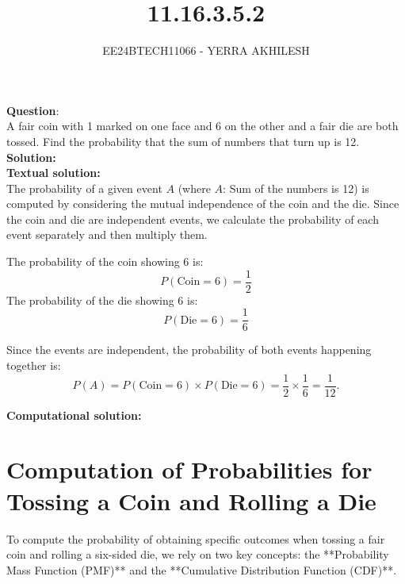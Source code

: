 \documentclass[journal]{IEEEtran}
\begin{document}

\vspace{3cm}

\title{11.16.3.5.2}
\author{EE24BTECH11066 - YERRA AKHILESH}
{\let\newpage\relax\maketitle}

\renewcommand{\thefigure}{\theenumi}
\renewcommand{\thetable}{\theenumi}
\setlength{\intextsep}{10pt} %

\renewcommand{\thetable}{\theenumi}

\textbf{Question}:\\ 

A fair coin with 1 marked on one face and 6 on the other and a fair die are both tossed. Find the probability that the sum of numbers that turn up is 12.\\

\textbf{Solution: }\\
\textbf{Textual solution: }\\
The probability of a given event $A$ (where $A$: Sum of the numbers is 12) is computed by considering the mutual independence of the coin and the die. Since the coin and die are independent events, we calculate the probability of each event separately and then multiply them.

The probability of the coin showing 6 is:
\[
P(\text{Coin} = 6) = \frac{1}{2}
\]
The probability of the die showing 6 is:
\[
P(\text{Die} = 6) = \frac{1}{6}
\]

Since the events are independent, the probability of both events happening together is:
\[
P(A) = P(\text{Coin} = 6) \times P(\text{Die} = 6) = \frac{1}{2} \times \frac{1}{6} = \frac{1}{12}.
\]


\textbf{Computational solution: }
\section*{Computation of Probabilities for Tossing a Coin and Rolling a Die}

To compute the probability of obtaining specific outcomes when tossing a fair coin and rolling a six-sided die, we rely on two key concepts: the **Probability Mass Function (PMF)** and the **Cumulative Distribution Function (CDF)**.
\end{document}
